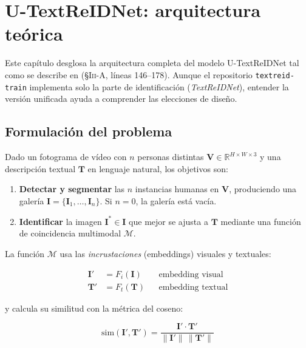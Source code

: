 \chapter{U-TextReIDNet: arquitectura teórica}
\label{cap:arquitectura-teorica}

Este capítulo desglosa la arquitectura completa del modelo
U-TextReIDNet tal como se describe en 
(§\textsc{Iii}-A, líneas 146--178). Aunque el repositorio
\texttt{textreid-train} implementa solo la parte de identificación
(\emph{TextReIDNet}), entender la versión unificada ayuda a
comprender las elecciones de diseño.

\section{Formulación del problema}

Dado un fotograma de vídeo con $n$ personas distintas
$\mathbf{V} \in \mathbb{R}^{H \times W \times 3}$ y una descripción
textual $\mathbf{T}$ en lenguaje natural, los objetivos son:

\begin{enumerate}
  \item \textbf{Detectar y segmentar} las $n$ instancias humanas en
        $\mathbf{V}$, produciendo una galería
        $\mathbf{I} = \{\mathbf{I}_1, \ldots, \mathbf{I}_n\}$.
        Si $n = 0$, la galería está vacía.
  \item \textbf{Identificar} la imagen $\mathbf{I}^* \in \mathbf{I}$
        que mejor se ajusta a $\mathbf{T}$ mediante una función de
        coincidencia multimodal $\mathcal{M}$.
\end{enumerate}

La función $\mathcal{M}$ usa las \emph{incrustaciones} (embeddings)
visuales y textuales:

\begin{align}
  \mathbf{I}' &= F_i(\mathbf{I}) && \text{embedding visual} \\
  \mathbf{T}' &= F_t(\mathbf{T}) && \text{embedding textual}
\end{align}

\noindent y calcula su similitud con la métrica del coseno:

\begin{equation}
  \text{sim}(\mathbf{I}', \mathbf{T}') =
  \frac{\mathbf{I}' \cdot \mathbf{T}'}{\|\mathbf{I}'\|\,\|\mathbf{T}'\|}
  \label{eq:cosine}
\end{equation}

